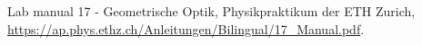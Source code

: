 
\begin{thebibliography}{99}




Lab manual 17 - Geometrische Optik, Physikpraktikum der ETH Zurich,  \url{https://ap.phys.ethz.ch/Anleitungen/Bilingual/17_Manual.pdf}.

\end{thebibliography}

